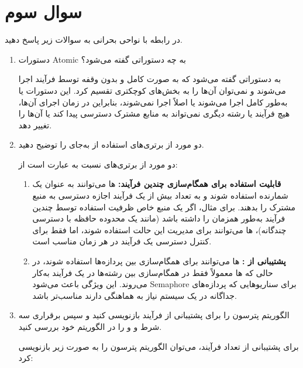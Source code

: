 \section{سوال سوم}

در رابطه با نواحی بحرانی به سوالات زیر پاسخ دهید.

\begin{enumerate}
	\item 
	دستورات Atomic به چه دستوراتی گفته می‌شود؟
	
	\begin{qsolve}
	به دستوراتی گفته می‌شود که به صورت کامل و بدون وقفه توسط فرآیند اجرا می‌شوند و نمی‌توان آن‌ها را به بخش‌های کوچکتری تقسیم کرد. این دستورات یا به‌طور کامل اجرا می‌شوند یا اصلاً اجرا نمی‌شوند، بنابراین در زمان اجرای آن‌ها، هیچ فرآیند یا رشته دیگری نمی‌تواند به منابع مشترک دسترسی پیدا کند یا آن‌ها را تغییر دهد.
	\end{qsolve}
	
	
	\item 
	دو مورد از برتری‌های استفاده از  به‌جای  را توضیح دهید.
	
	\begin{qsolve}
		دو مورد از برتری‌های  نسبت به  عبارت است از:
		
		\begin{enumerate}
			\item 
			\textbf{قابلیت استفاده برای همگام‌سازی چندین فرآیند:}
			‌ها می‌توانند به عنوان یک شمارنده استفاده شوند و به تعداد بیش از یک فرآیند اجازه دسترسی به منبع مشترک را بدهند. برای مثال، اگر یک منبع خاص ظرفیت استفاده توسط چندین فرآیند به‌طور همزمان را داشته باشد (مانند یک محدوده حافظه با دسترسی چندگانه)، ‌ها می‌توانند برای مدیریت این حالت استفاده شوند، اما  فقط برای کنترل دسترسی یک فرآیند در هر زمان مناسب است.
			
			
			\item
			\textbf{پشتیبانی از :}
			‌ها می‌توانند برای همگام‌سازی بین پردازه‌ها استفاده شوند، در حالی که ‌ها معمولاً فقط در همگام‌سازی بین رشته‌ها در یک فرآیند به‌کار می‌روند. این ویژگی باعث می‌شود Semaphore برای سناریوهایی که پردازه‌های جداگانه در یک سیستم نیاز به هماهنگی دارند مناسب‌تر باشد.
		\end{enumerate}
	\end{qsolve}
	
	
	
	\item 
	الگوریتم پترسون را برای پشتیبانی از  فرآیند بازنویسی کنید و سپس برقراری سه شرط   و و  را در الگوریتم خود بررسی کنید.
	
	\begin{qsolve}
		برای پشتیبانی از تعداد  فرآیند، می‌توان الگوریتم پترسون را به صورت زیر بازنویسی کرد:	
	\end{qsolve}	
\end{enumerate}

